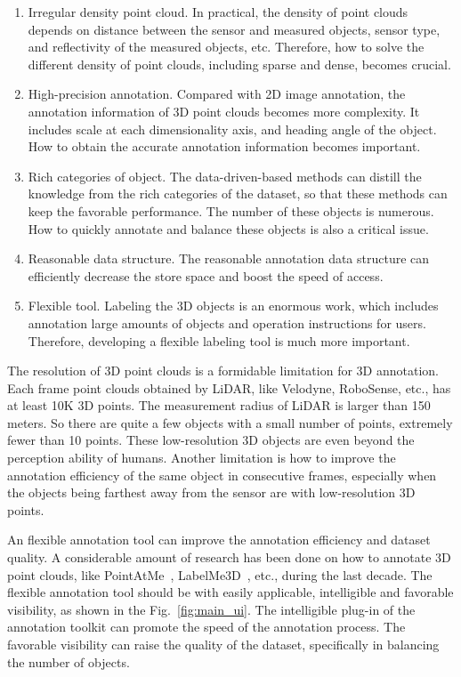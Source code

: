 \documentclass[letterpaper, 10 pt, conference]{ieeeconf}  %
\begin{document}
\begin{enumerate}
  \item Irregular density point cloud. In practical, the density of point clouds depends on distance between the sensor and measured objects, sensor type, and reflectivity of the measured objects, etc. Therefore, how to solve the different density of point clouds, including sparse and dense, becomes crucial.
  \item High-precision annotation. Compared with 2D image annotation, the annotation information of 3D point clouds becomes more complexity. It includes scale at each dimensionality axis, and heading angle of the object. How to obtain the accurate annotation information becomes important.
  \item Rich categories of object. The data-driven-based methods can distill the knowledge from the rich categories of the dataset, so that these methods can keep the favorable performance. The number of these objects is numerous. How to quickly annotate and balance these objects is also a critical issue.
  \item Reasonable data structure. The reasonable annotation data structure can efficiently decrease the store space and boost the speed of access.
  \item Flexible tool. Labeling the 3D objects is an enormous work, which includes annotation large amounts of objects and operation instructions for users. Therefore, developing a flexible labeling tool is much more important.
\end{enumerate}

The resolution of 3D point clouds is a formidable limitation for 3D annotation. Each frame point clouds obtained by LiDAR, like Velodyne, RoboSense, etc., has at least 10K 3D points. The measurement radius of  LiDAR is larger than 150 meters. So there are quite a few objects with a small number of points, extremely fewer than 10 points. These low-resolution 3D objects are even beyond the perception ability of humans. Another limitation is how to improve the annotation efficiency of the same object in consecutive frames, especially when the objects being farthest away from the sensor are with low-resolution 3D points.

An flexible annotation tool can improve the annotation efficiency and dataset quality. A considerable amount of research has been done on how to annotate 3D point clouds, like PointAtMe~\cite{pointatme}, LabelMe3D~\cite{LabelMe3D}, etc., during the last decade. The flexible annotation tool should be with easily applicable, intelligible and favorable visibility, as shown in the Fig.~\ref{fig:main_ui}. The intelligible plug-in of the annotation toolkit can promote the speed of the annotation process. The favorable visibility can raise the quality of the dataset, specifically in balancing the number of objects.
\end{document}
